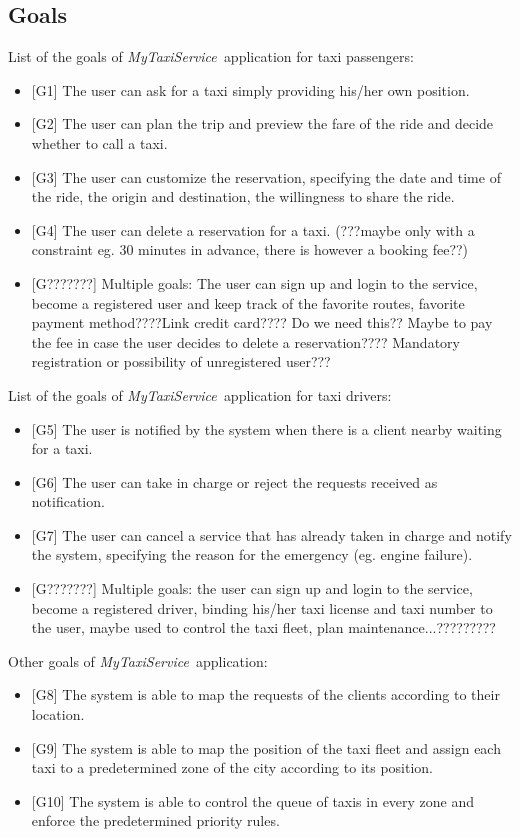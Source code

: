 \documentclass[a4paper,11pt]{report} %
\newcommand{\mts}{\mbox{\normalfont\itshape MyTaxiService\ }}
\begin{document}
	\subsection{Goals} List of the goals of \mts application for taxi passengers:
		\begin{itemize}
			\item {[}G1{]} The user can ask for a taxi simply providing his/her own position.
			\item {[}G2{]} The user can plan the trip and preview the fare of the ride and decide whether to call a taxi.
			\item {[}G3{]} The user can customize the reservation, specifying the date and time of the ride, the origin and destination, the willingness to share the ride.
			\item {[}G4{]} The user can delete a reservation for a taxi. (???maybe only with a constraint eg. 30 minutes in advance, there is however a booking fee??)
			\item {[}G???????{]} Multiple goals: The user can sign up and login to the service, become a registered user and keep track of the favorite routes, favorite payment method????Link credit card???? Do we need this?? Maybe to pay the fee in case the user decides to delete a reservation???? Mandatory registration or possibility of unregistered user???
		\end{itemize}
		List of the goals of \mts application for taxi drivers:
		\begin{itemize}
			\item {[}G5{]} The user is notified by the system when there is a client nearby waiting for a taxi.
			\item {[}G6{]} The user can take in charge or reject the requests received as notification.
			\item {[}G7{]} The user can cancel a service that has already taken in charge and notify the system, specifying the reason for the emergency (eg. engine failure).
			\item {[}G???????{]} Multiple goals: the user can sign up and login to the service, become a registered driver, binding his/her taxi license and taxi number to the user, maybe used to control the taxi fleet, plan maintenance...?????????
		\end{itemize}
		Other goals of \mts application:
		\begin{itemize}
			\item {[}G8{]} The system is able to map the requests of the clients according to their location.
			\item {[}G9{]} The system is able to map the position of the taxi fleet and assign each taxi to a predetermined zone of the city according to its position.
			\item {[}G10{]} The system is able to control the queue of taxis in every zone and enforce the predetermined priority rules.
		\end{itemize}
	
\end{document}

